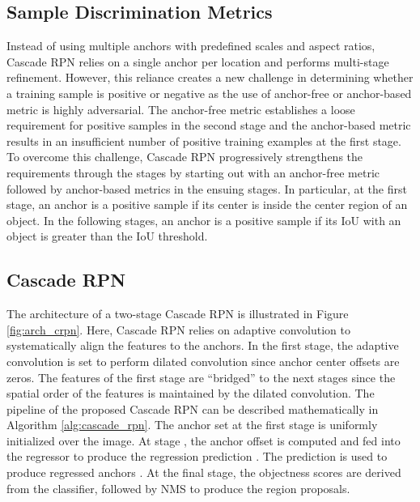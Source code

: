 \documentclass{article}
\begin{document}
	\subsection{Sample Discrimination Metrics}
	Instead of using multiple anchors with predefined scales and aspect ratios, Cascade RPN relies on a single anchor per location and performs multi-stage refinement. However, this reliance creates a new challenge in determining whether a training sample is positive or negative as the use of anchor-free or anchor-based metric is highly adversarial. The anchor-free metric establishes a loose requirement for positive samples in the second stage and the anchor-based metric results in an insufficient number of positive training examples at the first stage. To overcome this challenge, Cascade RPN progressively strengthens the requirements through the stages by starting out with an anchor-free metric followed by anchor-based metrics in the ensuing stages. In particular, at the first stage, an anchor is a positive sample if its center is inside the center region of an object. In the following stages, an anchor is a positive sample if its IoU with an object is greater than the IoU threshold.
	
	\subsection{Cascade RPN}
	The architecture of a two-stage Cascade RPN is illustrated in Figure \ref{fig:arch_crpn}. Here, Cascade RPN relies on adaptive convolution to systematically align the features to the anchors. In the first stage, the adaptive convolution is set to perform dilated convolution since anchor center offsets are zeros. The features of the first stage are \enquote{bridged} to the next stages since the spatial order of the features is maintained by the dilated convolution. The pipeline of the proposed Cascade RPN can be described mathematically in Algorithm \ref{alg:cascade_rpn}. The anchor set at the first stage  is uniformly initialized over the image. At stage , the anchor offset  is computed and fed into the regressor  to produce the regression prediction . The prediction  is used to produce regressed anchors . At the final stage, the objectness scores are derived from the classifier, followed by NMS to produce the region proposals. 
	
\end{document}
